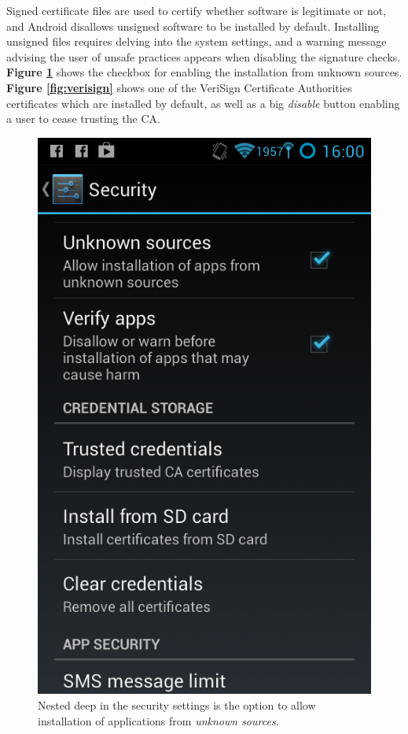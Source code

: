 \documentclass[a4paper]{article}
\begin{document}
\noindent Signed certificate files are used to certify whether software is
legitimate or not, and Android disallows unsigned software to be installed by default.
Installing unsigned files requires delving into the system settings, and a
warning message advising the user of unsafe practices appears when disabling the
signature checks. \textbf{Figure \ref{fig:unknown_sources}} shows the checkbox
for enabling the installation from unknown sources. \textbf{Figure
\ref{fig:verisign}} shows one of the VeriSign Certificate Authorities
certificates which are installed by default, as well as a big \emph{disable}
button enabling a user to cease trusting the CA.
\\
\begin{figure}[htb]
\centering
\includegraphics[scale=0.4, bb=0 0 480
800]{img/unknown_sources.png}
\caption{Nested deep in the security settings is the option to allow
installation of applications from \emph{unknown sources}.}
\label{fig:unknown_sources}
\end{figure} 
\end{document}
